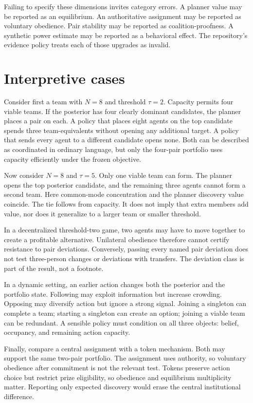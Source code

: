 \documentclass[11pt]{article}
\begin{document}
Failing to specify these dimensions invites category errors. A planner value
may be reported as an equilibrium. An authoritative assignment may be reported
as voluntary obedience. Pair stability may be reported as coalition-proofness.
A synthetic power estimate may be reported as a behavioral effect. The
repository's evidence policy treats each of those upgrades as invalid.

\section{Interpretive cases}

Consider first a team with $N=8$ and threshold $\tau=2$. Capacity permits four
viable teams. If the posterior has four clearly dominant candidates, the
planner places a pair on each. A policy that places eight agents on the top
candidate spends three team-equivalents without opening any additional target.
A policy that sends every agent to a different candidate opens none. Both can
be described as coordinated in ordinary language, but only the four-pair
portfolio uses capacity efficiently under the frozen objective.

Now consider $N=8$ and $\tau=5$. Only one viable team can form. The planner
opens the top posterior candidate, and the remaining three agents cannot form a
second team. Here common-mode concentration and the planner discovery value
coincide. The tie follows from capacity. It does not imply that extra members
add value, nor does it generalize to a larger team or smaller threshold.

In a decentralized threshold-two game, two agents may have to move together to
create a profitable alternative. Unilateral obedience therefore cannot certify
resistance to pair deviations. Conversely, passing every named pair deviation
does not test three-person changes or deviations with transfers. The deviation
class is part of the result, not a footnote.

In a dynamic setting, an earlier action changes both the posterior and the
portfolio state. Following may exploit information but increase crowding.
Opposing may diversify action but ignore a strong signal. Joining a singleton
can complete a team; starting a singleton can create an option; joining a
viable team can be redundant. A sensible policy must condition on all three
objects: belief, occupancy, and remaining action capacity.

Finally, compare a central assignment with a token mechanism. Both may support
the same two-pair portfolio. The assignment uses authority, so voluntary
obedience after commitment is not the relevant test. Tokens preserve action
choice but restrict prize eligibility, so obedience and equilibrium
multiplicity matter. Reporting only expected discovery would erase the central
institutional difference.
\end{document}

